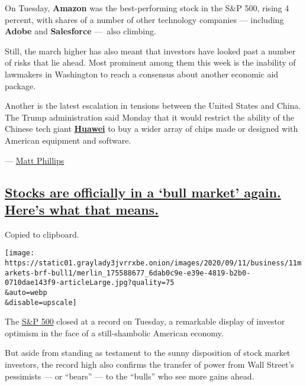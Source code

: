 On Tuesday, \textbf{Amazon} was the best-performing stock in the S\&P
500, rising 4 percent, with shares of a number of other technology
companies --- including \textbf{Adobe} and \textbf{Salesforce} ---~also
climbing.

Still, the march higher has also meant that investors have looked past a
number of risks that lie ahead. Most prominent among them this week is
the inability of lawmakers in Washington to reach a consensus about
another economic aid package.

Another is the latest escalation in tensions between the United States
and China. The Trump administration said Monday that it would restrict
the ability of the Chinese tech giant
\textbf{\href{https://www.nytimes3xbfgragh.onion/2020/08/17/technology/trump-huawei-commerce-chips.html}{Huawei}}
to buy a wider array of chips made or designed with American equipment
and software.

--- \href{https://www.nytimes3xbfgragh.onion/by/matt-phillips}{Matt
Phillips}

\hypertarget{stocks-are-officially-in-a-bull-market-again-heres-what-that-means}{%
\subsection{\texorpdfstring{\protect\hyperlink{stocks-are-officially-in-a-bull-market-again-heres-what-that-means}{Stocks
are officially in a `bull market' again. Here's what that
means.}}{Stocks are officially in a `bull market' again. Here's what that means.}}\label{stocks-are-officially-in-a-bull-market-again-heres-what-that-means}}

Copied to clipboard.

\texttt{[image: https://static01.graylady3jvrrxbe.onion/images/2020/09/11/business/11markets-brf-bull1/merlin\_175588677\_6dab0c9e-e39e-4819-b2b0-0710dae143f9-articleLarge.jpg?quality=75\\\&auto=webp\\\&disable=upscale]}

The
\href{https://www.nytimes3xbfgragh.onion/live/2020/08/18/business/stock-market-today-coronavirus\#sp-500-hits-a-record-as-traders-looks-past-economic-devastation}{S\&P
500} closed at a record on Tuesday, a remarkable display of investor
optimism in the face of a still-shambolic American economy.

But aside from standing as testament to the sunny disposition of stock
market investors, the record high also confirms the transfer of power
from Wall Street's pessimists --- or ``bears'' --- to the ``bulls'' who
see more gains ahead.

